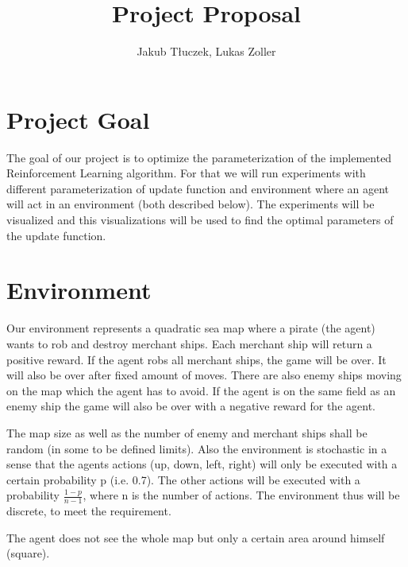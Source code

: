 \documentclass[11pt]{article} %
\title{Project Proposal}
\author{Jakub Tłuczek, Lukas Zoller}
\begin{document}
\maketitle

\section{Project Goal}
The goal of our project is to optimize the parameterization of the implemented Reinforcement Learning algorithm. For that we will run experiments with different parameterization of update function and environment where an agent will act in an environment (both described below). The experiments will be visualized and this visualizations will be used to find the optimal parameters of the update function.

\section{Environment}
Our environment represents a quadratic sea map where a pirate (the agent) wants to rob and destroy merchant ships. Each merchant ship will return a positive reward. If the agent robs all merchant ships, the game will be over. It will also be over after fixed amount of moves. There are also enemy ships moving on the map which the agent has to avoid. If the agent is on the same field as an enemy ship the game will also be over with a negative reward for the agent.

The map size as well as the number of enemy and merchant ships shall be random (in some to be defined limits). Also the environment is stochastic in a sense that the agents actions (up, down, left, right) will only be executed with a certain probability p (i.e. 0.7). The other actions will be executed with a probability $\frac{1-p}{n-1}$, where n is the number of actions. The environment thus will be discrete, to meet the requirement.

The agent does not see the whole map but only a certain area around himself (square). 
\end{document}
